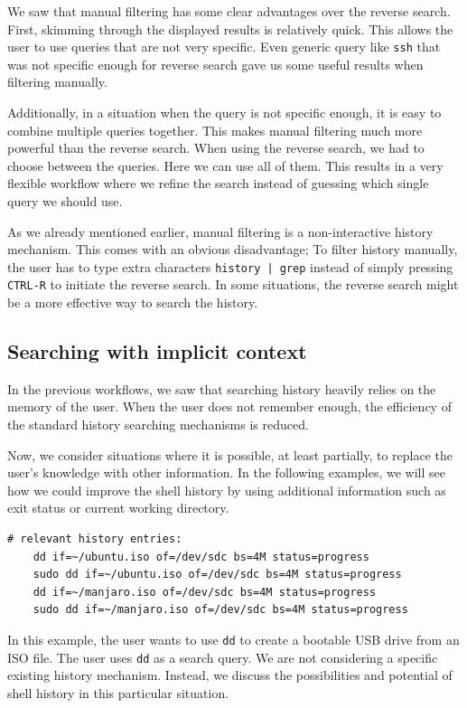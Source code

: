 We saw that manual filtering has some clear advantages over the reverse search.
First, skimming through the displayed results is relatively quick. This allows the user to use queries that are not very specific.
Even generic query like \verb|ssh| that was not specific enough for reverse search gave us some useful results when filtering manually.

Additionally, in a situation when the query is not specific enough, it is easy to combine multiple queries together. This makes manual filtering much more powerful than the reverse search. 
When using the reverse search, we had to choose between the queries. Here we can use all of them. This results in a very flexible workflow where we refine the search instead of guessing which single query we should use.


As we already mentioned earlier, manual filtering is a non-interactive history mechanism. This comes with an obvious disadvantage; To filter history manually, the user has to type extra characters \verb#history | grep# instead of simply pressing \verb|CTRL-R| to initiate the reverse search. In some situations, the reverse search might be a more effective way to search the history.




\subsection{Searching with implicit context}\label{workflow-search-w-implicit-context}
In the previous workflows, we saw that searching history heavily relies on the memory of the user. When the user does not remember enough, the efficiency of the standard history searching mechanisms is reduced.

Now, we consider situations where it is possible, at least partially, to replace the user's knowledge with other information. In the following examples, we will see how we could improve the shell history by using additional information such as exit status or current working directory.

\begin{verbatim}
# relevant history entries:        
    dd if=~/ubuntu.iso of=/dev/sdc bs=4M status=progress
    sudo dd if=~/ubuntu.iso of=/dev/sdc bs=4M status=progress
    dd if=~/manjaro.iso of=/dev/sdc bs=4M status=progress
    sudo dd if=~/manjaro.iso of=/dev/sdc bs=4M status=progress
\end{verbatim}

In this example, the user wants to use \verb|dd| to create a bootable USB drive from an ISO file. The user uses \verb|dd| as a search query. We are not considering a specific existing history mechanism. Instead, we discuss the possibilities and potential of shell history in this particular situation.

